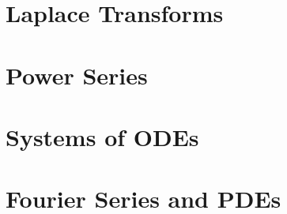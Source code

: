 \documentclass[letterpaper,oneside]{book}%
\theoremstyle{plain}
\theoremstyle{box}
\theoremstyle{problem}
\begin{document}
\chapter{Laplace Transforms}



\chapter{Power Series}



\chapter{Systems of ODEs}



\chapter{Fourier Series and PDEs}


\end{document}
